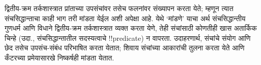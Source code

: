 \documentclass[../../../include/open-logic-section]{subfiles}
\begin{document}


द्वितीय-क्रम तर्कशास्त्रात प्रांताच्या उपसंचांवर तसेच
फलनांवर संख्यापन करता येते; म्हणून त्यात संचसिद्धान्ताचा
काही भाग तरी मांडता येईल अशी अपेक्षा आहे. येथे
‘मांडणे’ याचा अर्थ संचसिद्धान्तीय गुणधर्म आणि विधाने
द्वितीय-क्रम तर्कशास्त्रात व्यक्त करता येणे, तेही
संचांसाठी कोणतीही खास अतार्किक चिन्हे (उदा.,
संचसिद्धान्तातील सदस्यत्वाचे !!{predicate}) न वापरता.
उदाहरणार्थ, संचांचे संयोग आणि छेद तसेच उपसंच-संबंध
परिभाषित करता येतात; शिवाय संचांच्या आकारांची तुलना
करता येते आणि कँटरच्या प्रमेयासारखे निष्कर्षही मांडता येतात.
\end{document}
